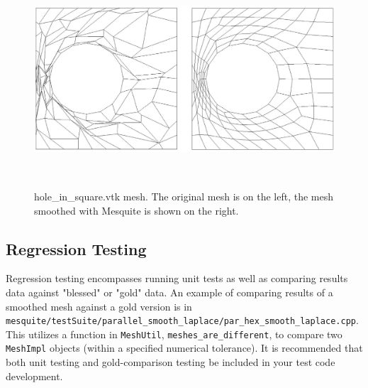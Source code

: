 \begin{figure}[htbp]
\begin{center}
    \includegraphics[height=80mm]{hole_in_square.eps}
    \caption{hole\_in\_square.vtk mesh. The original mesh is on the left, the mesh smoothed with
    Mesquite is shown on the right.}
    \label{fig:hole}
\end{center}
\end{figure}



\subsection{Regression Testing}
\label{sec:RegressionTesting}
Regression testing encompasses
running unit tests as well as comparing results data against "blessed"
or "gold" data.  An example of comparing results of a smoothed mesh
against a gold version is in
\texttt{mesquite/testSuite/parallel\_smooth\_laplace/par\_hex\_smooth\_laplace.cpp}.
This utilizes a function in \texttt{MeshUtil}, \texttt{meshes\_are\_different}, to compare
two \texttt{MeshImpl} objects (within a specified numerical tolerance).  It is
recommended that both unit testing and gold-comparison testing be
included in your test code development.
